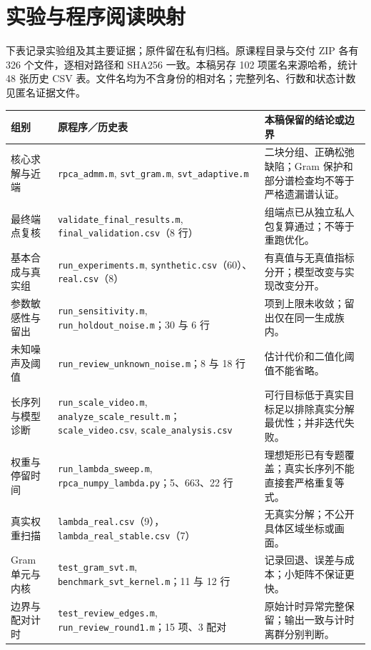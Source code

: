 \documentclass[UTF8,fontset=none,zihao=-4,a4paper]{ctexart}
\theoremstyle{plainzh}
\numberwithin{equation}{section}
\begin{document}
\clearpage
\appendix
\section{实验与程序阅读映射}
下表记录实验组及其主要证据；原件留在私有归档。原课程目录与交付 ZIP 各有 326 个文件，逐相对路径和 SHA256 一致。本稿另存 102 项匿名来源哈希，统计 48 张历史 CSV 表。文件名均为不含身份的相对名；完整列名、行数和状态计数见匿名证据文件。
\small
\setlength{\LTpre}{0pt}\setlength{\LTpost}{0pt}
\begin{longtable}{>{\raggedright\arraybackslash}p{}>{\raggedright\arraybackslash}p{}>{\raggedright\arraybackslash}p{}}
\toprule
组别 & 原程序／历史表 & 本稿保留的结论或边界\\
\midrule\endhead
核心求解与近端 & \texttt{rpca\_admm.m}, \texttt{svt\_gram.m}, \texttt{svt\_adaptive.m} & 二块分组、正确松弛缺陷；Gram 保护和部分谱检查均不等于严格遗漏谱认证。\\
最终端点复核 & \texttt{validate\_final\_results.m}, \texttt{final\_validation.csv}（8 行） & 8 组端点已从独立私人包复算通过；不等于重跑优化。\\
基本合成与真实组 & \texttt{run\_experiments.m}, \texttt{synthetic.csv}（60）、\texttt{real.csv}（8） & 有真值与无真值指标分开；模型改变与实现改变分开。\\
参数敏感性与留出 & \texttt{run\_sensitivity.m}, \texttt{run\_holdout\_noise.m}；30 与 6 行 & 2 项到上限未收敛；留出仅在同一生成族内。\\
未知噪声及阈值 & \texttt{run\_review\_unknown\_noise.m}；8 与 18 行 & 估计代价和二值化阈值不能省略。\\
长序列与模型诊断 & \texttt{run\_scale\_video.m}, \texttt{analyze\_scale\_result.m}；\texttt{scale\_video.csv}, \texttt{scale\_analysis.csv} & 可行目标低于真实目标足以排除真实分解最优性；并非迭代失败。\\
权重与停留时间 & \texttt{run\_lambda\_sweep.m}, \texttt{rpca\_numpy\_lambda.py}；5、663、22 行 & 理想矩形已有专题覆盖；真实长序列不能直接套严格重复等式。\\
真实权重扫描 & \texttt{lambda\_real.csv}（9），\texttt{lambda\_real\_stable.csv}（7） & 无真实分解；不公开具体区域坐标或画面。\\
Gram 单元与内核 & \texttt{test\_gram\_svt.m}, \texttt{benchmark\_svt\_kernel.m}；11 与 12 行 & 记录回退、误差与成本；小矩阵不保证更快。\\
边界与配对计时 & \texttt{test\_review\_edges.m}, \texttt{run\_review\_round1.m}；15 项、3 配对 & 原始计时异常完整保留；输出一致与计时离群分别判断。\\

\end{longtable}
\end{document}
